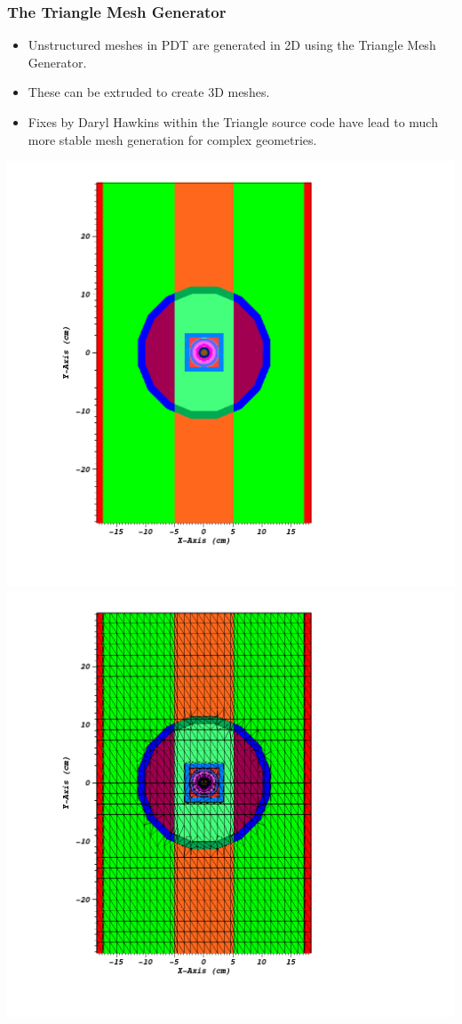 \documentclass[compress]{beamer}
\begin{document}
\begin{frame}[t]\frametitle{The Triangle Mesh Generator}
	\begin{block}{}
	\begin{itemize}
		\item Unstructured meshes in PDT are generated in 2D using the Triangle Mesh Generator.
		\item These can be extruded to create 3D meshes.
		\item Fixes by Daryl Hawkins within the Triangle source code have lead to much more stable mesh generation for complex geometries.
	\end{itemize}	
	\end{block}
	\includegraphics[scale = 0.15]{figures/IM12DPoly.png}
	\includegraphics[scale = 0.15]{figures/IM12DMesh.png}
\end{frame}
\end{document}
